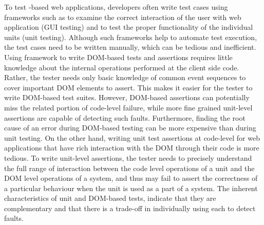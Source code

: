 To test \javascript-based web applications, developers
often write test cases using frameworks such as \selenium to examine the correct interaction of the user with web application (GUI testing) and \qunit to test the proper functionality of the individual units (unit testing).
Although such frameworks help to automate test execution, the
test cases need to be written manually, which can be tedious
and inefficient. 
Using \selenium framework to write DOM-based tests and assertions
requires little knowledge about the internal operations performed at the client side code. Rather, the tester needs only basic knowledge of common event sequences to cover important DOM elements to assert. 
This makes it easier for the tester to write DOM-based test suites. However, DOM-based assertions can potentially miss the related portion of
code-level failure, while more fine grained unit-level assertions are capable of detecting such faults. Furthermore, finding the root cause of an error during DOM-based testing can be more expensive than during unit testing. On the other hand,
writing unit test assertions at code-level for web applications that have rich interaction with the DOM through their \javascript code is more tedious. 
To write unit-level assertions, the tester needs to precisely understand the full range of interaction between the code level operations of a unit and the DOM level operations of a system, and thus may fail to assert the correctness of a particular behaviour when the unit is used as a part of a system. The inherent characteristics of unit and DOM-based tests, indicate that they are complementary and that there is a trade-off in individually using each to detect faults. 


